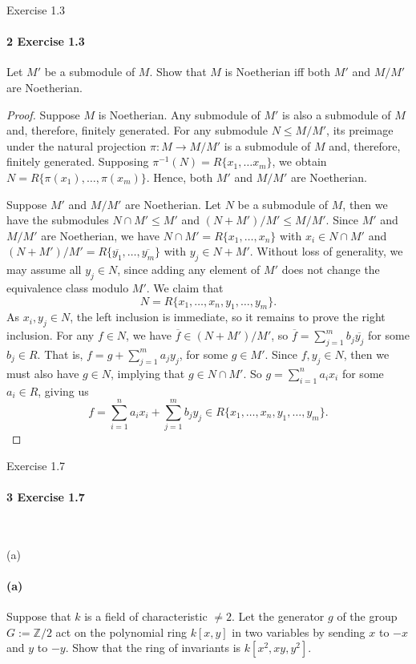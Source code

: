 \documentclass[12pt]{article}
\newlength{\myparskip}
\newenvironment{fullbox}{\begin{lrbox}{\savefullbox}\begin{minipage}{\dimexpr\textwidth-2\fboxsep\relax}\setlength{\parskip}{\myparskip}}{\end{minipage}\end{lrbox}\framebox[\textwidth]{\usebox{\savefullbox}}}
\newenvironment{pbox}[1][]{\begin{fullbox}\ifx#1\empty\else\paragraph{#1}\fi}{\end{fullbox}}
\newcommand{\Z}{\mathbb{Z}}
\newcommand{\<}{\langle}
\renewcommand{\>}{\rangle}
\newcommand{\eqc}{\overline}
\begin{document}
\newpage
\begin{pbox}[2 Exercise 1.3]
    Let $M'$ be a submodule of $M$. Show that $M$ is Noetherian iff both $M'$ and $M/M'$ are Noetherian.
\end{pbox}

\begin{proof}
    Suppose $M$ is Noetherian. Any submodule of $M'$ is also a submodule of $M$ and, therefore, finitely generated. For any submodule $N \leq M/M'$, its preimage under the natural projection $\pi : M \to M/M'$ is a submodule of $M$ and, therefore, finitely generated. Supposing $\pi^{-1}(N) = R\{x_1, \dots x_m\}$, we obtain $N = R\{\pi(x_1), \dots, \pi(x_m)\}$. Hence, both $M'$ and $M/M'$ are Noetherian.

    Suppose $M'$ and $M/M'$ are Noetherian. Let $N$ be a submodule of $M$, then we have the submodules $N \cap M' \leq M'$ and $ (N + M')/M' \leq M/M'$. Since $M'$ and $M/M'$ are Noetherian, we have $N \cap M' = R\{x_1, \dots, x_n\}$ with $x_i \in N \cap M'$ and $(N + M')/M' = R\{\eqc{y_1}, \dots, \eqc{y_m}\}$ with $y_j \in N + M'$. Without loss of generality, we may assume all $y_j \in N$, since adding any element of $M'$ does not change the equivalence class modulo $M'$. We claim that
    \[
        N = R\{x_1, \dots, x_n, y_1, \dots, y_m\}.
    \]
    As $x_i, y_j \in N$, the left inclusion is immediate, so it remains to prove the right inclusion. For any $f \in N$, we have $\eqc{f} \in (N + M')/M'$, so $\eqc{f} = \sum_{j=1}^{m} b_j\eqc{y_j}$ for some $b_j \in R$. That is, $f = g + \sum_{j=1}^{m} a_jy_j$, for some $g \in M'$. Since $f, y_j \in N$, then we must also have $g \in N$, implying that $g \in N \cap M'$. So $g = \sum_{i=1}^{n} a_ix_i$ for some $a_i \in R$, giving us
    \[
        f 
            = \sum_{i=1}^{n} a_ix_i + \sum_{j=1}^{m} b_jy_j
            \in R\{x_1, \dots, x_n, y_1, \dots, y_m\}.
    \]
\end{proof}



\newpage
\begin{pbox}[3 Exercise 1.7]
    \,
\end{pbox}

\begin{pbox}[(a)]
    Suppose that $k$ is a field of characteristic $\ne 2$. Let the generator $g$ of the group $G := \Z/2$ act on the polynomial ring $k[x, y]$ in two variables by sending $x$ to $-x$ and $y$ to $-y$. Show that the ring of invariants is $k[x^2, xy, y^2]$.
\end{pbox}
\end{document}
